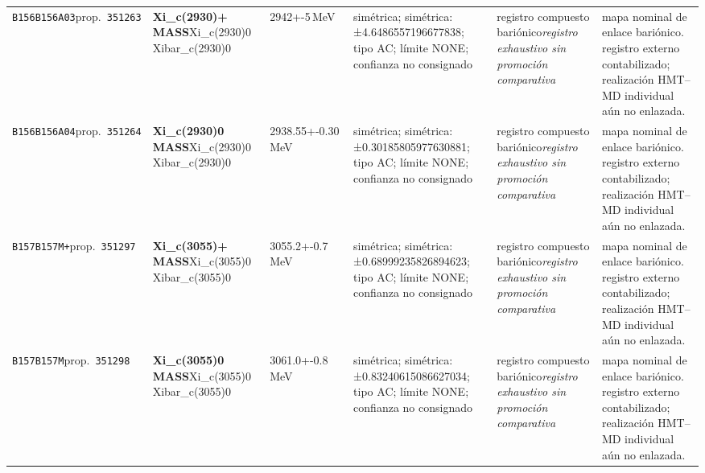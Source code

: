 \begin{landscape}
\begin{longtable}{L{1.85cm}L{4.45cm}L{2.35cm}L{4.05cm}L{3.35cm}L{7.15cm}}
\texttt{B156}\newline \texttt{B156A03}\newline prop.\ \texttt{351263} & \textbf{Xi\_\allowbreak{}c(2930)+ MASS}\newline Xi\_\allowbreak{}c(2930)0 \textbar{}\allowbreak{} Xibar\_\allowbreak{}c(2930)0 & 2942+-5\,MeV & simétrica; simétrica: ±4.6486557196677838; tipo AC; límite NONE; confianza no consignado & registro compuesto bariónico\newline \emph{registro exhaustivo sin promoción comparativa} & mapa nominal de enlace bariónico. registro externo contabilizado; realización HMT--MD individual aún no enlazada. \\
\texttt{B156}\newline \texttt{B156A04}\newline prop.\ \texttt{351264} & \textbf{Xi\_\allowbreak{}c(2930)0 MASS}\newline Xi\_\allowbreak{}c(2930)0 \textbar{}\allowbreak{} Xibar\_\allowbreak{}c(2930)0 & 2938.55+-0.30\,MeV & simétrica; simétrica: ±0.30185805977630881; tipo AC; límite NONE; confianza no consignado & registro compuesto bariónico\newline \emph{registro exhaustivo sin promoción comparativa} & mapa nominal de enlace bariónico. registro externo contabilizado; realización HMT--MD individual aún no enlazada. \\
\texttt{B157}\newline \texttt{B157M+}\newline prop.\ \texttt{351297} & \textbf{Xi\_\allowbreak{}c(3055)+ MASS}\newline Xi\_\allowbreak{}c(3055)0 \textbar{}\allowbreak{} Xibar\_\allowbreak{}c(3055)0 & 3055.2+-0.7\,MeV & simétrica; simétrica: ±0.68999235826894623; tipo AC; límite NONE; confianza no consignado & registro compuesto bariónico\newline \emph{registro exhaustivo sin promoción comparativa} & mapa nominal de enlace bariónico. registro externo contabilizado; realización HMT--MD individual aún no enlazada. \\
\texttt{B157}\newline \texttt{B157M}\newline prop.\ \texttt{351298} & \textbf{Xi\_\allowbreak{}c(3055)0 MASS}\newline Xi\_\allowbreak{}c(3055)0 \textbar{}\allowbreak{} Xibar\_\allowbreak{}c(3055)0 & 3061.0+-0.8\,MeV & simétrica; simétrica: ±0.83240615086627034; tipo AC; límite NONE; confianza no consignado & registro compuesto bariónico\newline \emph{registro exhaustivo sin promoción comparativa} & mapa nominal de enlace bariónico. registro externo contabilizado; realización HMT--MD individual aún no enlazada. \\

\end{longtable}
\end{landscape}
